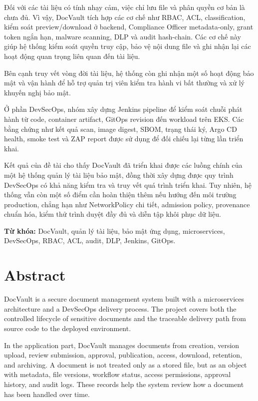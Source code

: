 Đối với các tài liệu có tính nhạy cảm, việc chỉ lưu file và phân quyền cơ bản là chưa đủ. Vì vậy, DocVault tích hợp các cơ chế như RBAC, ACL, classification, kiểm soát preview/download ở backend, Compliance Officer metadata-only, grant token ngắn hạn, malware scanning, DLP và audit hash-chain. Các cơ chế này giúp hệ thống kiểm soát quyền truy cập, bảo vệ nội dung file và ghi nhận lại các hoạt động quan trọng liên quan đến tài liệu.

Bên cạnh truy vết vòng đời tài liệu, hệ thống còn ghi nhận một số hoạt động bảo mật và vận hành để hỗ trợ quản trị viên kiểm tra hành vi bất thường và xử lý khuyến nghị bảo mật.

Ở phần DevSecOps, nhóm xây dựng Jenkins pipeline để kiểm soát chuỗi phát hành từ code, container artifact, GitOps revision đến workload trên EKS. Các bằng chứng như kết quả scan, image digest, SBOM, trạng thái ký, Argo CD health, smoke test và ZAP report được sử dụng để đối chiếu lại từng lần triển khai.

Kết quả của đề tài cho thấy DocVault đã triển khai được các luồng chính của một hệ thống quản lý tài liệu bảo mật, đồng thời xây dựng được quy trình DevSecOps có khả năng kiểm tra và truy vết quá trình triển khai. Tuy nhiên, hệ thống vẫn còn một số điểm cần hoàn thiện thêm nếu hướng đến môi trường production, chẳng hạn như NetworkPolicy chi tiết, admission policy, provenance chuẩn hóa, kiểm thử trình duyệt đầy đủ và diễn tập khôi phục dữ liệu.

\textbf{Từ khóa:} DocVault, quản lý tài liệu, bảo mật ứng dụng, microservices, DevSecOps, RBAC, ACL, audit, DLP, Jenkins, GitOps.

\clearpage

\chapter*{Abstract}

DocVault is a secure document management system built with a microservices architecture and a DevSecOps delivery process. The project covers both the controlled lifecycle of sensitive documents and the traceable delivery path from source code to the deployed environment.

In the application part, DocVault manages documents from creation, version upload, review submission, approval, publication, access, download, retention, and archiving. A document is not treated only as a stored file, but as an object with metadata, file versions, workflow status, access permissions, approval history, and audit logs. These records help the system review how a document has been handled over time.

